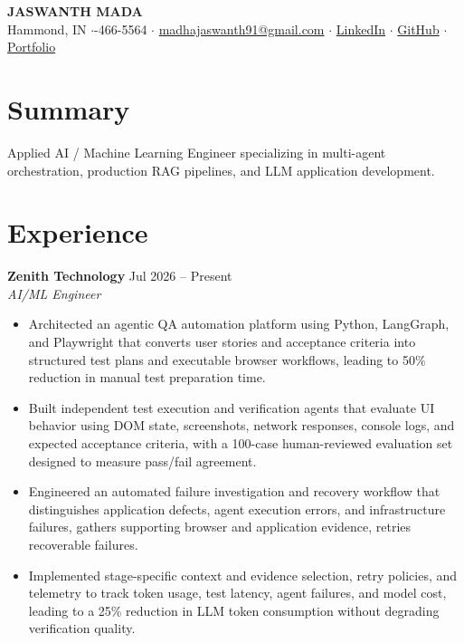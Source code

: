 \documentclass[10pt, letterpaper]{article}
\begin{document}
\fontsize{9.5}{10.5}\selectfont

\begin{center}
    {\Huge \bfseries \color{primary} JASWANTH MADA} \\[2pt]
    \small
    Hammond, IN \quad$\cdot$-466-5564 \quad$\cdot$\quad
    \href{mailto:madhajaswanth91@gmail.com}{madhajaswanth91@gmail.com} \quad$\cdot$\quad
    \href{https://www.linkedin.com/in/jaswanthmadha/}{LinkedIn} \quad$\cdot$\quad
    \href{https://github.com/Jaswanth19-596/}{GitHub} \quad$\cdot$\quad
    \href{https://madajaswanth.netlify.app/}{Portfolio}
\end{center}

\vspace{-6pt}

\section{Summary}
Applied AI / Machine Learning Engineer specializing in multi-agent orchestration, production RAG pipelines, and LLM application development.

\section{Experience}
\textbf{Zenith Technology} \hfill Jul 2026 -- Present \\
\textit{AI/ML Engineer}
\begin{itemize}
    \item Architected an agentic QA automation platform using Python, LangGraph, and Playwright that converts user stories and acceptance criteria into structured test plans and executable browser workflows, leading to 50\% reduction in manual test preparation time.
    \item Built independent test execution and verification agents that evaluate UI behavior using DOM state, screenshots, network responses, console logs, and expected acceptance criteria, with a 100-case human-reviewed evaluation set designed to measure pass/fail agreement.
    \item Engineered an automated failure investigation and recovery workflow that distinguishes application defects, agent execution errors, and infrastructure failures, gathers supporting browser and application evidence, retries recoverable failures.
    \item Implemented stage-specific context and evidence selection, retry policies, and telemetry to track token usage, test latency, agent failures, and model cost, leading to a 25\% reduction in LLM token consumption without degrading verification quality.
\end{itemize}
\end{document}
